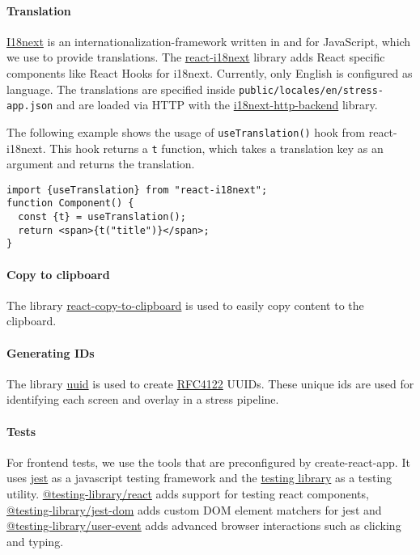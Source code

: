 \paragraph{Translation}
\href{https://www.i18next.com}{I18next} is an internationalization-framework written in and for JavaScript, which we use to provide translations. 
The \href{https://react.i18next.com}{react-i18next} library adds React specific components like React Hooks for i18next. 
Currently, only English is configured as language. 
The translations are specified inside \texttt{public/locales/en/stress-app.json} and are loaded via HTTP with the \href{https://github.com/i18next/i18next-http-backend}{i18next-http-backend} library.

The following example shows the usage of \texttt{useTranslation()} hook from react-i18next. 
This hook returns a \texttt{t} function, which takes a translation key as an argument and returns the translation.
\begin{verbatim}
import {useTranslation} from "react-i18next";
function Component() {
  const {t} = useTranslation();
  return <span>{t("title")}</span>;
}
\end{verbatim}

\paragraph{Copy to clipboard}
The library \href{https://github.com/nkbt/react-copy-to-clipboard}{react-copy-to-clipboard} is used to easily copy content to the clipboard.

\paragraph{Generating IDs}
The library \href{https://github.com/uuidjs/uuid}{uuid} is used to create \href{https://www.ietf.org/rfc/rfc4122.txt}{RFC4122} UUIDs. 
These unique ids are used for identifying each screen and overlay in a stress pipeline.

\paragraph{Tests}
For frontend tests, we use the tools that are preconfigured by create-react-app. 
It uses \href{https://jestjs.io/}{jest} as a javascript testing framework and the \href{https://testing-library.com}{testing library} as a testing utility. 
\href{https://www.npmjs.com/package/@testing-library/react}{@testing-library/react} adds support for testing react components, 
\href{https://www.npmjs.com/package/@testing-library/jest-dom}{@testing-library/jest-dom} adds custom DOM element matchers for jest and 
\href{https://www.npmjs.com/package/@testing-library/user-event}{@testing-library/user-event} adds advanced browser interactions such as clicking and typing.

